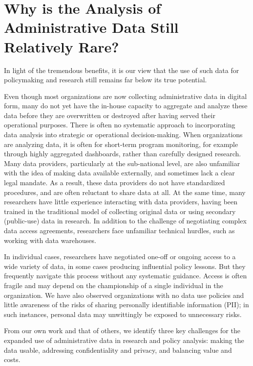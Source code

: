 \hypertarget{why-is-the-analysis-of-administrative-data-still-relatively-rare}{%
\section{Why is the Analysis of Administrative Data Still Relatively Rare?}\label{why-is-the-analysis-of-administrative-data-still-relatively-rare}}

In light of the tremendous benefits, it is our view that the use of such data for policymaking and research still remains far below its true potential.

Even though most organizations are now collecting administrative data in digital form, many do not yet have the in-house capacity to aggregate and analyze these data before they are overwritten or destroyed after having served their operational purposes. There is often no systematic approach to incorporating data analysis into strategic or operational decision-making. When organizations are analyzing data, it is often for short-term program monitoring, for example through highly aggregated dashboards, rather than carefully designed research. Many data providers, particularly at the sub-national level, are also unfamiliar with the idea of making data available externally, and sometimes lack a clear legal mandate. As a result, these data providers do not have standardized procedures, and are often reluctant to share data at all. At the same time, many researchers have little experience interacting with data providers, having been trained in the traditional model of collecting original data or using secondary (public-use) data in research. In addition to the challenge of negotiating complex data access agreements, researchers face unfamiliar technical hurdles, such as working with data warehouses.

In individual cases, researchers have negotiated one-off or ongoing access to a wide variety of data, in some cases producing influential policy lessons. But they frequently navigate this process without any systematic guidance. Access is often fragile and may depend on the championship of a single individual in the organization. We have also observed organizations with no data use policies and little awareness of the risks of sharing personally identifiable information (PII); in such instances, personal data may unwittingly be exposed to unnecessary risks.

From our own work and that of others, we identify three key challenges for the expanded use of administrative data in research and policy analysis: making the data usable, addressing confidentiality and privacy, and balancing value and costs.

